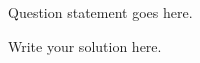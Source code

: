 \documentclass[12pt]{article}
\begin{document}


\begin{problem}{1} 
Question statement goes here.
\end{problem}
\begin{sol}
Write your solution here.
\end{sol}


\begin{comment}
\begin{problem}{1} 
Question statement goes here.
\end{problem}
\begin{sol}
Write your solution here.
\end{sol}
\end{comment}

\end{document}
